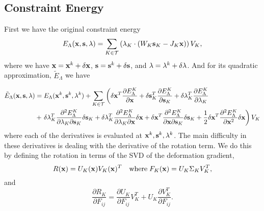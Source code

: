 \subsection{Constraint Energy}

First we have the original constraint energy
\begin{equation}
E_\Lambda (\mathbf{x}, \mathbf{s}, \mathbf{\lambda}) = \sum_{K \in \mathcal{T}} \left( \mathbf{\lambda}_K \cdot (W_K \mathbf{s}_K - J_K \mathbf{x}) \right) V_K,
\end{equation}
where we have $\mathbf{x} = \mathbf{x}^k + \delta \mathbf{x}$, $\mathbf{s} = \mathbf{s}^k + \delta \mathbf{s}$, and $\mathbf{\lambda} = \mathbf{\lambda}^k + \delta \mathbf{\lambda}$. And for its quadratic approximation, $\tilde{E}_\Lambda$ we have

\begin{equation}
\begin{split}
\tilde{E}_\Lambda (\mathbf{x}, \mathbf{s}, \mathbf{\lambda}) &=  E_\Lambda (\mathbf{x}^k,\mathbf{s}^k,\mathbf{\lambda}^k) 
+ \sum_{K \in \mathcal{T}} \left( 
  \delta \mathbf{x}^T \frac{\partial E_\Lambda^K}{\partial \mathbf{x}} 
+ \delta \mathbf{s}_K^T \frac{\partial E_\Lambda^K}{\partial \mathbf{s}_K}
+ \delta \mathbf{\lambda}_K^T \frac{\partial E_\Lambda^K}{\partial \mathbf{\lambda}_K} \right. \\
&+ \left. \delta \mathbf{\lambda}_K^T \frac{\partial^2 E_\Lambda^K}{\partial \mathbf{\lambda}_K \partial \mathbf{s}_K} \delta \mathbf{s}_K
+ \delta \mathbf{\lambda}_K^T \frac{\partial^2 E_\Lambda^K}{\partial \mathbf{\lambda}_K \partial \mathbf{x}} \delta \mathbf{x}
+ \delta \mathbf{x}^T \frac{\partial^2 E_\Lambda^K}{\partial \mathbf{x} \partial \mathbf{s}_K} \delta \mathbf{s}_K
+ \frac{1}{2} \delta \mathbf{x}^T \frac{\partial^2 E_\Lambda^K}{\partial \mathbf{x}^2} \delta \mathbf{x}
 \right) V_K
\end{split}
\end{equation}
where each of the derivatives is evaluated at $\mathbf{x}^k, \mathbf{s}^k, \mathbf{\lambda}^k$. The main difficulty in these derivatives is dealing with the derivative of the rotation term. We do this by defining the rotation in terms of the SVD of the deformation gradient,
\begin{equation}
R(\mathbf{x}) = U_K(\mathbf{x}) V_K(\mathbf{x})^T \quad \text{where} \; F_K(\mathbf{x}) = U_K \Sigma_K V_K^T,
\end{equation}
and
\begin{equation}
\frac{\partial R_K}{\partial F_{ij}} = \frac{\partial U_K}{\partial F_{ij}}V_K^T
+ U_K \frac{\partial V_K^T}{\partial F_{ij}}.
\end{equation}

